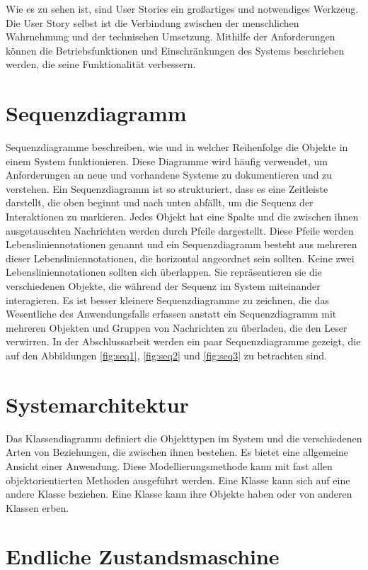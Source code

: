 Wie es zu sehen ist, sind User Stories ein großartiges und notwendiges Werkzeug. Die User Story selbst ist die Verbindung zwischen der menschlichen Wahrnehmung und der technischen Umsetzung. Mithilfe der Anforderungen können die Betriebsfunktionen und Einschränkungen des Systems beschrieben werden, die seine Funktionalität verbessern.

\section{Sequenzdiagramm}
\label{sec:design:sequenz}
Sequenzdiagramme beschreiben, wie und in welcher Reihenfolge die Objekte in einem System funktionieren. Diese Diagramme wird häufig verwendet, um Anforderungen an neue und vorhandene Systeme zu dokumentieren und zu verstehen. Ein Sequenzdiagramm ist so strukturiert, dass es eine Zeitleiste darstellt, die oben beginnt und nach unten abfällt, um die Sequenz der Interaktionen zu markieren. Jedes Objekt hat eine Spalte und die zwischen ihnen ausgetauschten Nachrichten werden durch Pfeile dargestellt. Diese Pfeile werden Lebensliniennotationen genannt und ein Sequenzdiagramm besteht aus mehreren dieser Lebensliniennotationen, die horizontal angeordnet sein sollten. Keine zwei Lebensliniennotationen sollten sich überlappen. Sie repräsentieren sie die verschiedenen Objekte, die während der Sequenz im System miteinander interagieren. Es ist besser kleinere Sequenzdiagramme zu zeichnen, die das Wesentliche des Anwendungsfalls erfassen
anstatt ein Sequenzdiagramm mit mehreren Objekten und Gruppen von Nachrichten zu überladen, die den Leser verwirren. In der Abschlussarbeit werden ein paar Sequenzdiagramme gezeigt, die auf den Abbildungen \ref{fig:seq1}, \ref{fig:seq2} und \ref{fig:seq3} zu betrachten sind.

\section{Systemarchitektur}
\label{sec:design:arch}
Das Klassendiagramm definiert die Objekttypen im System und die verschiedenen Arten von Beziehungen, die zwischen ihnen bestehen. Es bietet eine allgemeine Ansicht einer Anwendung. Diese Modellierungsmethode kann mit fast allen objektorientierten Methoden ausgeführt werden. Eine Klasse kann sich auf eine andere Klasse beziehen. Eine Klasse kann ihre Objekte haben oder von anderen Klassen erben.

\section{Endliche Zustandsmaschine}
\label{sec:design:fsm}
